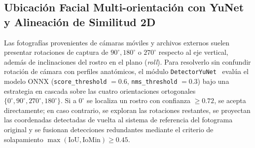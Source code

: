 \documentclass{article}
\begin{document}
\subsection{Ubicación Facial Multi-orientación con YuNet y Alineación de Similitud 2D}
Las fotografías provenientes de cámaras móviles y archivos externos suelen presentar rotaciones de captura de $90^\circ, 180^\circ$ o $270^\circ$ respecto al eje vertical, además de inclinaciones del rostro en el plano (\textit{roll}). Para resolverlo sin confundir rotación de cámara con perfiles anatómicos, el módulo \texttt{DetectorYuNet}~\cite{wu2023yunet} evalúa el modelo ONNX (\texttt{score\_threshold} $= 0.6$, \texttt{nms\_threshold} $= 0.3$) bajo una estrategia en cascada sobre las cuatro orientaciones ortogonales $\{0^\circ, 90^\circ, 270^\circ, 180^\circ\}$. Si a $0^\circ$ se localiza un rostro con confianza $\ge 0.72$, se acepta directamente; en caso contrario, se exploran las rotaciones restantes, se proyectan las coordenadas detectadas de vuelta al sistema de referencia del fotograma original y se fusionan detecciones redundantes mediante el criterio de solapamiento $\max(\text{IoU}, \text{IoMin}) \ge 0.45$.
\end{document}
